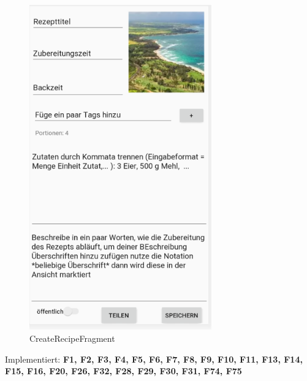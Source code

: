 \begin{figure}[H]
	\centering
	\includegraphics[width=0.7\textwidth]{pics/createRecipeFragment.png}%
	\caption{CreateRecipeFragment}%
	\label{view}%
\end{figure}
Implementiert: \textbf{F1, F2, F3, F4, F5, F6, F7, F8, F9, F10, F11, F13, F14, F15, F16, F20, F26, F32, F28, F29, F30, F31, F74, F75}
